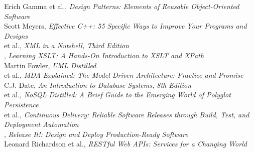 \documentclass[nobrand,anonymous,nodate,nosecurity]{huawei}
\begin{document}
\begin{multicols}{2}
{Erich Gamma et al.}, \emph{Design Patterns: Elements of Reusable Object-Oriented Software}\\[3pt]
{Scott Meyers}, \emph{Effective C++: 55 Specific Ways to Improve Your Programs and Designs}\\[3pt]
{ et al.}, \emph{XML in a Nutshell, Third Edition}\\[3pt]
{}, \emph{Learning XSLT: A Hands-On Introduction to XSLT and XPath}\\[3pt]
{Martin Fowler}, \emph{UML Distilled}\\[3pt]
{ et al.}, \emph{MDA Explained: The Model Driven Architecture: Practice and Promise}\\[3pt]
{C.J. Date}, \emph{An Introduction to Database Systems, 8th Edition}\\[3pt]
{ et al.}, \emph{NoSQL Distilled: A Brief Guide to the Emerging World of Polyglot Persistence}\\[3pt]
{ et al.}, \emph{Continuous Delivery: Reliable Software Releases through Build, Test, and Deployment Automation}\\[3pt]
{}, \emph{Release It!: Design and Deploy Production-Ready Software}\\[3pt]
{Leonard Richardson et al.}, \emph{RESTful Web APIs: Services for a Changing World}
\end{multicols}
\end{document}
